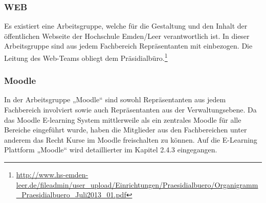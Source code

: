 \subsubsection{WEB}
Es existiert eine Arbeitsgruppe, welche für die Gestaltung und den Inhalt der öffentlichen Webseite der Hochschule Emden/Leer verantwortlich ist. In dieser Arbeitsgruppe sind aus jedem Fachbereich Repräsentanten mit einbezogen. Die Leitung des Web-Teams obliegt dem Präsidialbüro.\footnote{\url{http://www.hs-emden-leer.de/fileadmin/user_upload/Einrichtungen/Praesidialbuero/Organigramm_Praesidialbuero_Juli2013_01.pdf}}

\subsubsection{Moodle}
In der Arbeitsgruppe „Moodle“ sind sowohl Repräsentanten aus jedem Fachbereich involviert sowie auch Repräsentanten aus der Verwaltungsebene. Da das Moodle E-learning System mittlerweile als ein zentrales Moodle für alle Bereiche eingeführt wurde, haben die Mitglieder aus den Fachbereichen unter anderem das Recht Kurse im Moodle freischalten zu können. Auf die E-Learning Plattform „Moodle“ wird detaillierter im Kapitel 2.4.3 eingegangen.
